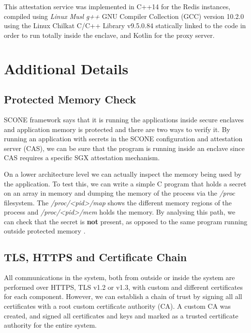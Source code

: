 This attestation service was implemented in C++14 for the Redis instances, compiled using \textit{Linux Musl g++} GNU Compiler Collection (GCC) version 10.2.0 using the Linux Chilkat C/C++ Library v9.5.0.84 statically linked to the code in order to run totally inside the enclave, and Kotlin for the proxy server.

\section{Additional Details}
\label{sec:additional_details}

\subsection{Protected Memory Check}
\label{ssec:protected_memory_check}

SCONE framework says that it is running the applications inside secure enclaves and application memory is protected and there are two ways to verify it. By running an application with secrets in the SCONE configuration and attestation server (\gls{CAS}), we can be sure that the program is running inside an enclave since CAS requires a specific \gls{SGX} attestation mechanism. 

On a lower architecture level we can actually inspect the memory being used by the application. To test this, we can write a simple C program that holds a secret on an array in memory and dumping the memory of the process via the \textit{/proc} filesystem. The \textit{/proc/<pid>/map} shows the different memory regions of the process and \textit{/proc/<pid>/mem} holds the memory. By analysing this path, we can check that the secret is \textbf{not} present, as opposed to the same program running outside protected memory \cite{scone:debug}.

\subsection{TLS, HTTPS and Certificate Chain}
\label{ssec:tls_https_certificate_chain}

All communications in the system, both from outside or inside the system are performed over \gls{HTTPS}, \gls{TLS} v1.2 or v1.3, with custom and different certificates for each component. However, we can establish a chain of trust by signing all all certificates with a root custom certificate authority (\gls{CA}). A custom \gls{CA} was created, and signed all certificates and keys and marked as a trusted certificate authority for the entire system.

